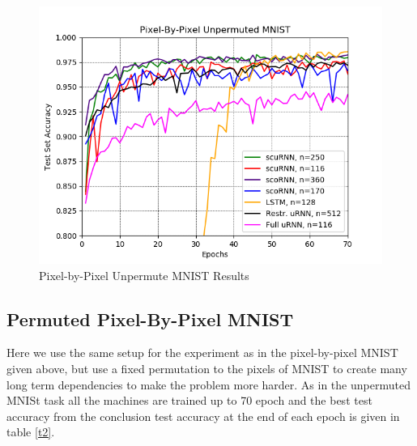 \documentclass[letterpaper]{article} %
\begin{document}
\begin{figure}
\centering
\includegraphics[width=0.8\linewidth]{Mnist_unpermuted.png}
  \caption{Pixel-by-Pixel Unpermute MNIST Results}
  \label{fig_mnist1}
\end{figure}

\subsection{Permuted Pixel-By-Pixel MNIST}
\noindent Here we use the same setup for the experiment as in the pixel-by-pixel MNIST given above, but use a fixed permutation to the pixels of MNIST to create many long term dependencies to  make the problem more harder. As in the unpermuted MNISt task all the machines are trained up to 70 epoch and the best test accuracy from the conclusion test accuracy at the end of each epoch is given in table \ref{t2}.\\
\end{document}
